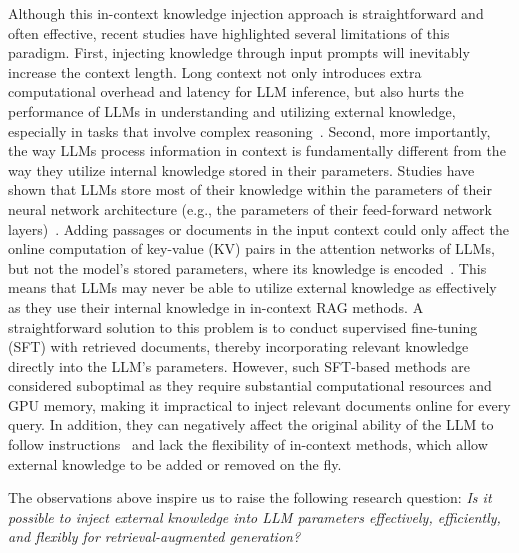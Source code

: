 \documentclass[sigconf,natbib=true,anonymous=false]{acmart}
\begin{document}
Although this in-context knowledge injection approach is straightforward and often effective, recent studies have highlighted several limitations of this paradigm. 
First, injecting knowledge through input prompts will inevitably increase the context length. Long context not only introduces extra computational overhead and latency for LLM inference, but also hurts the performance of LLMs in understanding and utilizing external knowledge, especially in tasks that involve complex reasoning~\cite{liu2024lost,levy2024same}. 
Second, more importantly, the way LLMs process information in context is fundamentally different from the way they utilize internal knowledge stored in their parameters. 
Studies have shown that LLMs store most of their knowledge within the parameters of their neural network architecture (e.g., the parameters of their feed-forward network layers)~\cite{yu-ananiadou-2024-neuron,nanda2023fact}. 
Adding passages or documents in the input context could only affect the online computation of key-value (KV) pairs in the attention networks of LLMs, but not the model’s stored parameters, where its knowledge is encoded~\cite{yu-ananiadou-2024-neuron}.
This means that LLMs may never be able to utilize external knowledge as effectively as they use their internal knowledge in in-context RAG methods.  
A straightforward solution to this problem is to conduct supervised fine-tuning (SFT) with retrieved documents, thereby incorporating relevant knowledge directly into the LLM’s parameters. However, such SFT-based methods are considered suboptimal as they require substantial computational resources and GPU memory, making it impractical to inject relevant documents online for every query. 
In addition, they can negatively affect the original ability of the LLM to follow instructions~\cite{wu2024continual,dong2023abilities} and lack the flexibility of in-context methods, which allow external knowledge to be added or removed on the fly.

The observations above inspire us to raise the following research question:
\textit{Is it possible to {inject external knowledge into LLM parameters }effectively, efficiently, and flexibly for retrieval-augmented generation?}
\end{document}
